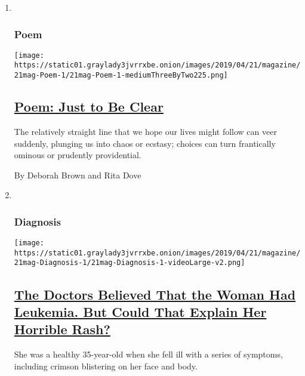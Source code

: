 \begin{enumerate}
\def\labelenumi{\arabic{enumi}.}
\item ~
  \hypertarget{poem}{%
  \subsubsection{Poem}\label{poem}}

  \texttt{[image: https://static01.graylady3jvrrxbe.onion/images/2019/04/21/magazine/21mag-Poem-1/21mag-Poem-1-mediumThreeByTwo225.png]}

  \hypertarget{poem-just-to-be-clear}{%
  \subsection{\texorpdfstring{\href{/2019/04/18/magazine/poem-just-to-be-clear.html}{Poem:
  Just to Be
  Clear}}{Poem: Just to Be Clear}}\label{poem-just-to-be-clear}}

  The relatively straight line that we hope our lives might follow can
  veer suddenly, plunging us into chaos or ecstasy; choices can turn
  frantically ominous or prudently providential.

  By Deborah Brown and Rita Dove
\item ~
  \hypertarget{diagnosis}{%
  \subsubsection{Diagnosis}\label{diagnosis}}

  \texttt{[image: https://static01.graylady3jvrrxbe.onion/images/2019/04/21/magazine/21mag-Diagnosis-1/21mag-Diagnosis-1-videoLarge-v2.png]}

  \hypertarget{the-doctors-believed-that-the-woman-had-leukemia-but-could-that-explain-her-horrible-rash}{%
  \subsection{\texorpdfstring{\href{/2019/04/17/magazine/diagnosis-doctors-believed-she-had-leukemia-but-could-that-explain-her-horrible-rash.html}{The
  Doctors Believed That the Woman Had Leukemia. But Could That Explain
  Her Horrible
  Rash?}}{The Doctors Believed That the Woman Had Leukemia. But Could That Explain Her Horrible Rash?}}\label{the-doctors-believed-that-the-woman-had-leukemia-but-could-that-explain-her-horrible-rash}}

  She was a healthy 35-year-old when she fell ill with a series of
  symptoms, including crimson blistering on her face and body.


\end{enumerate}
